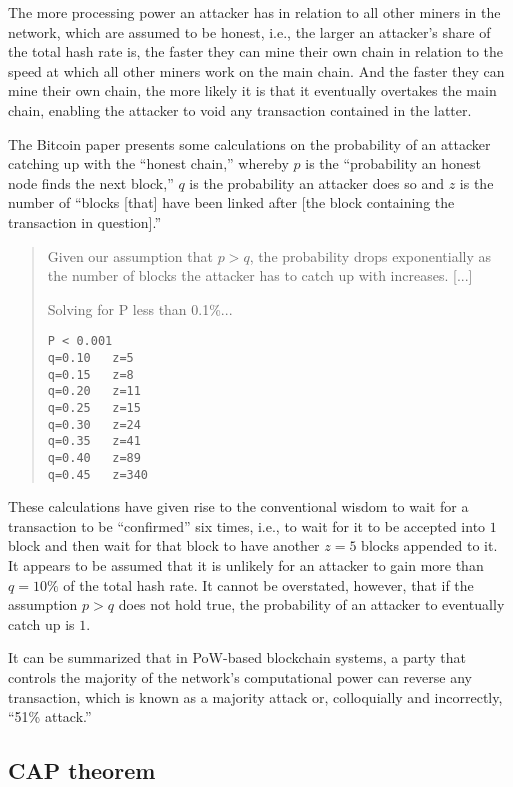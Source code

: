 The more processing power an attacker has in relation to all other miners in the network, which are assumed to be honest, i.e., the larger an attacker's share of the total hash rate is, the faster they can mine their own chain in relation to the speed at which all other miners work on the main chain.
And the faster they can mine their own chain, the more likely it is that it eventually overtakes the main chain, enabling the attacker to void any transaction contained in the latter.

The Bitcoin paper presents some calculations on the probability of an attacker catching up with the ``honest chain,'' whereby $p$ is the ``probability an honest node finds the next block,'' $q$ is the probability an attacker does so and $z$ is the number of ``blocks [that] have been linked after [the block containing the transaction in question].''

\begin{quote}
Given our assumption that $p > q$, the probability drops exponentially as the number of blocks the attacker has to catch up with increases. [...]
  
Solving for P less than 0.1\%...
  
\begin{verbatim}
P < 0.001
q=0.10   z=5
q=0.15   z=8
q=0.20   z=11
q=0.25   z=15
q=0.30   z=24
q=0.35   z=41
q=0.40   z=89
q=0.45   z=340
\end{verbatim}
\end{quote}

These calculations have given rise to the conventional wisdom to wait for a transaction to be ``confirmed'' \autocite{bitcoinwiki2018confirmation} six times, i.e., to wait for it to be accepted into $1$ block and then wait for that block to have another $z = 5$ blocks appended to it.
It appears to be assumed that it is unlikely for an attacker to gain more than $q = 10\%$ of the total hash rate.
It cannot be overstated, however, that if the assumption $p > q$ does not hold true, the probability of an attacker to eventually catch up is $1$.

It can be summarized that in PoW-based blockchain systems, a party that controls the majority of the network's computational power can reverse any transaction, which is known as a majority attack or, colloquially and incorrectly, ``51\% attack.''

\subsection{CAP theorem}

